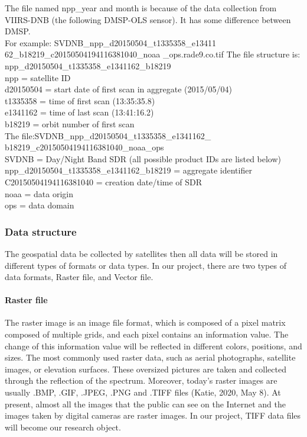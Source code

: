\documentclass[conference]{IEEEtran}
\begin{document}
The file named npp\_year and month is because of the data collection from VIIRS-DNB (the following DMSP-OLS sensor). 
	It has some difference between DMSP.
	\\
	For example:
	SVDNB\_npp\_d20150504\_t1335358\_e13411
	62\_b18219\_c20150504194116381040\_noaa
	\_ops.rade9.co.tif
	The file structure is:\\
	npp\_d20150504\_t1335358\_e1341162\_b18219\\
	npp = satellite ID\\
	d20150504 = start date of first scan in aggregate (2015/05/04)\\
	t1335358 = time of first scan (13:35:35.8)\\
	e1341162 = time of last scan (13:41:16.2)\\
	b18219 = orbit number of first scan
	\\
	The file:SVDNB\_npp\_d20150504\_t1335358\_e1341162\_
	b18219\_c20150504194116381040\_noaa\_ops\\
	SVDNB = Day/Night Band SDR (all possible product IDs are listed below)\\
	npp\_d20150504\_t1335358\_e1341162\_b18219 = aggregate identifier\\
	C20150504194116381040 = creation date/time of SDR\\
	noaa = data origin\\
	ops = data domain
	\\

	\subsubsection{Data structure}
	
	The geospatial data be collected by satellites then all data will be stored in different types of formats or data types. 
	In our project, there are two types of data formats, Raster file, and Vector file.
	
	\paragraph{Raster file} 
	
	The raster image is an image file format, which is composed of a pixel matrix composed of multiple grids, and each pixel 
	contains an information value. The change of this information value will be reflected in different colors, positions, and 
	sizes. The most commonly used raster data, such as aerial photographs, satellite images, or elevation surfaces. These 
	oversized pictures are taken and collected through the reflection of the spectrum. Moreover, today's raster images are 
	usually .BMP, .GIF, .JPEG, .PNG and .TIFF files (Katie, 2020, May 8). At present, almost all the images that the public 
	can see on the Internet and the images taken by digital cameras are raster images. In our project, TIFF data files will 
	become our research object.
	
\end{document}
